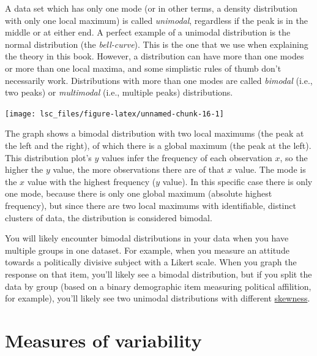 \documentclass[
  11pt,
  a4paper,
  twoside,symmetric,openright]{book}
\theoremstyle{break}
\theoremstyle{break}
\begin{document}
\hypertarget{calloutmultimodal}{}
\begin{callout}

A data set which has only one mode (or in other terms, a density distribution with only one local maximum) is called \emph{unimodal}, regardless if the peak is in the middle or at either end. A perfect example of a unimodal distribution is the normal distribution (the \emph{bell-curve}). This is the one that we use when explaining the theory in this book. However, a distribution can have more than one modes or more than one local maxima, and some simplistic rules of thumb don't necessarily work. Distributions with more than one modes are called \emph{bimodal} (i.e., two peaks) or \emph{multimodal} (i.e., multiple peaks) distributions.

\begin{center}\texttt{[image: lsc\_files/figure-latex/unnamed-chunk-16-1]} \end{center}

The graph shows a bimodal distribution with two local maximums (the peak at the left and the right), of which there is a global maximum (the peak at the left). This distribution plot's \(y\) values infer the frequency of each observation \(x\), so the higher the \(y\) value, the more observations there are of that \(x\) value. The mode is the \(x\) value with the highest frequency (\(y\) value). In this specific case there is only one mode, because there is only one global maximum (absolute highest frequency), but since there are two local maximums with identifiable, distinct clusters of data, the distribution is considered bimodal.

You will likely encounter bimodal distributions in your data when you have multiple groups in one dataset. For example, when you measure an attitude towards a politically divisive subject with a Likert scale. When you graph the response on that item, you'll likely see a bimodal distribution, but if you split the data by group (based on a binary demographic item measuring political affilition, for example), you'll likely see two unimodal distributions with different \protect\hyperlink{skewnesskurtosis}{skewness}.

\end{callout}

\hypertarget{var}{%
\section{Measures of variability}\label{var}}
\end{document}
